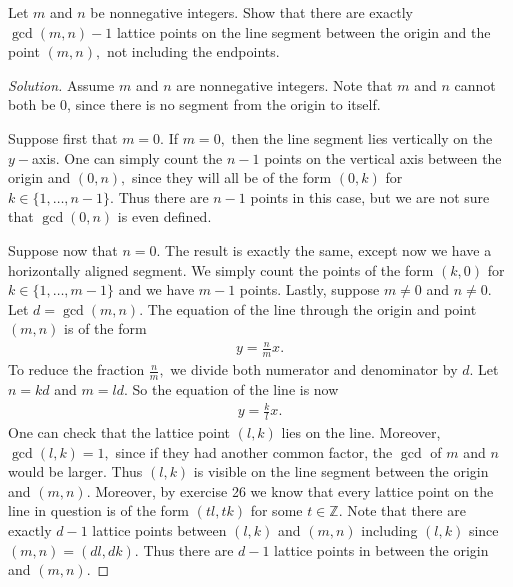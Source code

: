 \documentclass[12pt]{article}
\newcommand{\Z}{\mathbb{Z}}
\newenvironment{exercise}[2][Exercise]{\begin{trivlist}
        \item[\hskip \labelsep {\bfseries #1}\hskip \labelsep {\bfseries #2.}]}{\end{trivlist}}
\newenvironment{solution}
        {\begin{proof}[Solution]}
                    {\end{proof}}
\begin{document}
\begin{exercise}{27}
    Let \( m \) and \( n \) be nonnegative integers. Show that there are exactly \( \gcd(m,n ) -1 \) lattice points on the line segment between the origin and the point \( ( m,n ) , \) not including the endpoints.
    \begin{solution}
        Assume \( m \) and \( n \) are nonnegative integers. Note that \( m \) and \( n \) cannot both be 0, since there is no segment from the origin to itself.

        Suppose first that \( m = 0. \) If \( m=0, \) then the line segment lies vertically on the \( y- \)axis. One can simply count the \( n-1 \) points on the vertical axis between the origin and \( ( 0,n ) , \) since they will all be of the form \( ( 0,k ) \) for \( k \in \{ 1, \ldots, n-1 \} . \) Thus there are \( n-1 \) points in this case, but we are not sure that \( \gcd(0,n) \) is even defined.

        Suppose now that \( n = 0. \) The result is exactly the same, except now we have a horizontally aligned segment. We simply count the points of the form \( ( k, 0 ) \) for \( k \in \{ 1, \ldots, m-1 \} \) and we have \( m-1 \) points.
        Lastly, suppose \( m \neq 0 \) and \( n\neq 0. \) Let \( d = \gcd(m,n) . \) The equation of the line through the origin and point \( ( m,n ) \) is of the form
        \begin{align*}
            y = \frac{n}{m} x.
        \end{align*}
        To reduce the fraction \( \frac{n}{m} ,\) we divide both numerator and denominator by \( d \). Let \( n = k d \) and \( m = l d. \) So the equation of the line is now
        \begin{align*}
            y = \frac{k}{l} x.
        \end{align*}
        One can check that the lattice point \( ( l, k ) \) lies on the line. Moreover, \( \gcd(l,k) = 1, \) since if they had another common factor, the \( \gcd \) of \( m \) and \( n \) would be larger. Thus \( ( l, k ) \) is visible on the line segment between the origin and \( ( m,n ) . \) Moreover, by exercise 26 we know that every lattice point on the line in question is of the form \( ( tl,tk )  \) for some \( t \in \Z. \) Note that there are exactly \( d-1 \) lattice points between \( ( l,k ) \) and \( ( m,n ) \) including \( ( l,k ) \) since \( ( m,n ) = ( dl, dk ) . \) Thus there are \( d-1 \) lattice points in between the origin and \( ( m,n ) . \)
    \end{solution}
\end{exercise}
\end{document}
